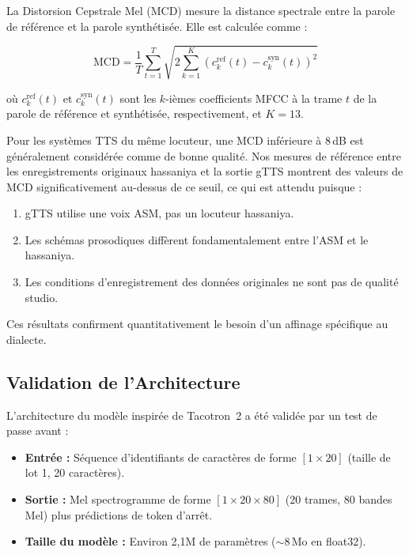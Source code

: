 \documentclass[12pt,a4paper]{article}
\begin{document}
La Distorsion Cepstrale Mel (MCD) mesure la distance spectrale entre la parole de référence et la parole synthétisée. Elle est calculée comme :

\begin{equation}
\text{MCD} = \frac{1}{T} \sum_{t=1}^{T} \sqrt{2 \sum_{k=1}^{K} (c_k^{\text{ref}}(t) - c_k^{\text{syn}}(t))^2}
\end{equation}

où $c_k^{\text{ref}}(t)$ et $c_k^{\text{syn}}(t)$ sont les $k$-ièmes coefficients MFCC à la trame $t$ de la parole de référence et synthétisée, respectivement, et $K = 13$.

Pour les systèmes TTS du même locuteur, une MCD inférieure à 8\,dB est généralement considérée comme de bonne qualité. Nos mesures de référence entre les enregistrements originaux hassaniya et la sortie gTTS montrent des valeurs de MCD significativement au-dessus de ce seuil, ce qui est attendu puisque :

\begin{enumerate}
    \item gTTS utilise une voix ASM, pas un locuteur hassaniya.
    \item Les schémas prosodiques diffèrent fondamentalement entre l'ASM et le hassaniya.
    \item Les conditions d'enregistrement des données originales ne sont pas de qualité studio.
\end{enumerate}

Ces résultats confirment quantitativement le besoin d'un affinage spécifique au dialecte.

\subsection{Validation de l'Architecture}

L'architecture du modèle inspirée de Tacotron~2 a été validée par un test de passe avant :

\begin{itemize}
    \item \textbf{Entrée :} Séquence d'identifiants de caractères de forme $[1 \times 20]$ (taille de lot 1, 20 caractères).
    \item \textbf{Sortie :} Mel spectrogramme de forme $[1 \times 20 \times 80]$ (20 trames, 80 bandes Mel) plus prédictions de token d'arrêt.
    \item \textbf{Taille du modèle :} Environ 2,1M de paramètres ($\sim$8\,Mo en float32).
\end{itemize}
\end{document}
